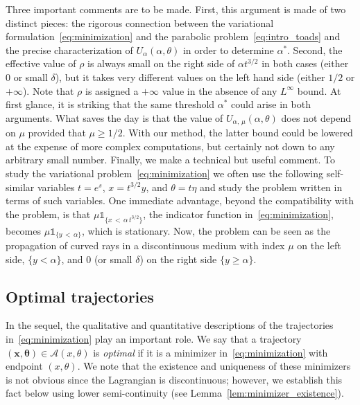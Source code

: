 \documentclass[10pt]{amsart}
\theoremstyle{definition}\newtheorem{defi}[theo]{Definition}\newtheorem{rema}[theo]{Remark}\newtheorem{exam}[theo]{Example}\newtheorem{exem}[theo]{Example}\newtheorem{nota}[theo]{Notation}
\newcommand{\bx}{\mathbf{x}}
\newcommand{\mA}{\mathcal{A}}
\newcommand{\btheta}{\boldsymbol{\theta}}
\newcommand{\1}{\mathds{1}}
\begin{document}
Three important comments are to be made. First, this argument is made of two distinct pieces: the rigorous connection between the variational formulation~\eqref{eq:minimization} and the parabolic problem~\eqref{eq:intro_toads} and the precise characterization of $U_\alpha(\alpha,\theta)$ in order to determine $\alpha^*$. Second, the effective value of $\rho$ is always small on the right side of $\alpha t^{3/2}$ in both cases (either 0 or small $\delta$), but it takes very different values on the left hand side (either $1/2$ or $+\infty$). Note that $\rho$ is assigned a $+\infty$ value in the absence of any $L^\infty$ bound. At first glance, it is striking that the same threshold $\alpha^*$ could arise in both arguments. What saves the day is that the value of $U_{\alpha,\,\mu}(\alpha,\theta)$ does not depend on $\mu$ provided that $\mu \geq 1/2$. With our method, the latter bound could be lowered at the expense of more complex computations, but certainly not down to any arbitrary small number. Finally, we make a technical but useful comment. To study the variational problem~\eqref{eq:minimization} we often use the following self-similar variables $t = e^s$, $x = t^{3/2} y$, and $\theta = t \eta$ and study the problem written in terms of such variables. One immediate advantage, beyond the compatibility with the problem, is that $\mu \1_{\{x\,<\,\alpha\,t^{3/2}\}}$, the indicator function in~\eqref{eq:minimization}, becomes $\mu \1_{\{y\,<\,\alpha\}}$, which is stationary. Now, the problem can be seen as the propagation of curved rays in a discontinuous medium with index $\mu$ on the left side, $\{y < \alpha\}$, and $0$ (or small $\delta$) on the right side $\{y\geq \alpha\}$.



\subsection*{Optimal trajectories}


In the sequel, the qualitative and quantitative descriptions of the trajectories in~\eqref{eq:minimization} play an important role. We say that a trajectory $(\bx,\btheta) \in \mA(x,\theta)$ is {\em optimal} if it is a minimizer in~\eqref{eq:minimization} with endpoint $(x,\theta)$. We note that the existence and uniqueness of these minimizers is not obvious since the Lagrangian is discontinuous; however, we establish this fact below using lower semi-continuity (see Lemma~\ref{lem:minimizer_existence}).
\end{document}
